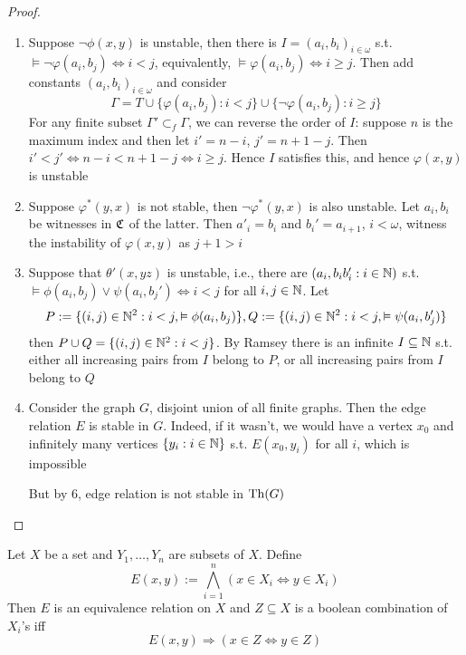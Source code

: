 \documentclass[11pt]{article}
\begin{document}
\begin{proof}
\begin{enumerate}
\item Suppose \(\neg\phi(x,y)\) is unstable, then there is \(I=(a_i,b_i)_{i\in\omega}\)
s.t. \(\vDash\neg\varphi(a_i,b_j)\Leftrightarrow i<j\), equivalently, \(\vDash\varphi(a_i,b_j)\Leftrightarrow i\ge j\).
Then add constants \((a_i,b_i)_{i\in\omega}\) and consider
\begin{equation*}
\Gamma=T\cup\{\varphi(a_i,b_j):i<j\}\cup\{\neg\varphi(a_i,b_j):i\ge j\}
\end{equation*}
For any finite subset \(\Gamma'\subset_f\Gamma\), we can reverse the order of \(I\): suppose \(n\) is the
maximum index and then let \(i'=n-i\), \(j'=n+1-j\). Then \(i'<j'\Leftrightarrow n-i<n+1-j\Leftrightarrow i\ge j\).
Hence \(I\) satisfies this, and hence \(\varphi(x,y)\) is unstable
\item Suppose \(\varphi^*(y,x)\) is not stable, then \(\neg\varphi^*(y,x)\) is also unstable. Let \(a_i,b_i\) be
witnesses in \(\mathfrak{C}\) of the latter. Then \(a'_i=b_i\) and \(b_i'=a_{i+1}\), \(i<\omega\), witness the
instability of \(\varphi(x,y)\) as \(j+1>i\)
\item Suppose that \(\theta'(x,yz)\) is unstable, i.e., there are \((a_i,b_ib_i':i\in\mathbb{N})\)
s.t. \(\vDash\phi(a_i,b_j)\vee\psi(a_i,b_j')\Leftrightarrow i<j\) for all \(i,j\in\mathbb{N}\).
Let
\begin{equation*}
P:=\{(i,j)\in\mathbb{N}^2:i<j,\vDash\phi(a_i,b_j)\},Q:=\{(i,j)\in\mathbb{N}^2:i<j,\vDash\psi(a_i,b_j')\}
\end{equation*}
then \(P\cup Q=\{(i,j)\in\mathbb{N}^2:i<j\}\). By Ramsey there is an infinite \(I\subseteq\mathbb{N}\) s.t. either all
increasing pairs from \(I\) belong to \(P\), or all increasing pairs from \(I\) belong
to \(Q\)
\setcounter{enumi}{6}
\item Consider the graph \(G\), disjoint union of all finite graphs. Then the edge
relation \(E\) is stable in \(G\). Indeed, if it wasn't, we would have a vertex \(x_0\) and
infinitely many vertices \(\{y_i:i\in\mathbb{N}\}\) s.t. \(E(x_0,y_i)\) for all \(i\), which is impossible

But by 6, edge relation is not stable in \(\operatorname{Th}(G)\)
\end{enumerate}
\end{proof}

\begin{lemma}[]
\label{y2.9}
Let \(X\) be a set and \(Y_1,\dots,Y_n\) are subsets of \(X\). Define
\begin{equation*}
E(x,y):=\bigwedge_{i=1}^n(x\in X_i\Leftrightarrow y\in X_i)
\end{equation*}
Then \(E\) is an equivalence relation on \(X\) and \(Z\subseteq X\) is a boolean combination of \(X_i\)'s
iff
\begin{equation*}
E(x,y)\Rightarrow (x\in Z\Leftrightarrow y\in Z)
\end{equation*}
\end{lemma}
\end{document}
